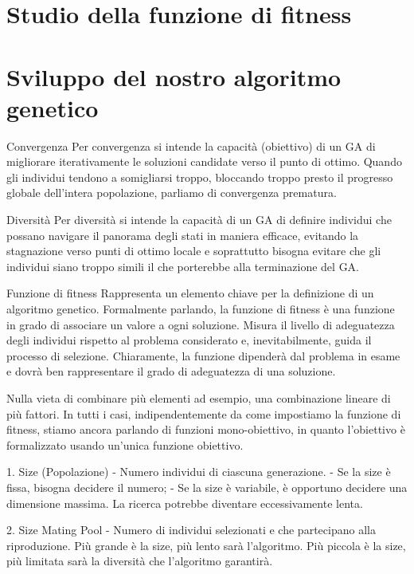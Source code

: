 \documentclass{article}
\begin{document}
\pagebreak

    \section{Studio della funzione di fitness}

    \section{Sviluppo del nostro algoritmo genetico}

    Convergenza Per convergenza si intende la capacità (obiettivo) di un GA di migliorare iterativamente le soluzioni candidate verso il punto di ottimo. Quando gli
    individui tendono a somigliarsi troppo, bloccando troppo presto il progresso globale dell’intera popolazione, parliamo di convergenza prematura.

    Diversità Per diversità si intende la capacità di un GA di definire individui che possano navigare il panorama degli stati in maniera efficace, evitando la
    stagnazione verso punti di ottimo locale e soprattutto bisogna evitare che gli individui siano troppo simili il che porterebbe alla terminazione del GA.

    Funzione di fitness Rappresenta un elemento chiave per la definizione di un algoritmo genetico. Formalmente parlando, la funzione di fitness è una funzione in grado
    di associare un valore a ogni soluzione. Misura il livello di adeguatezza degli individui rispetto al problema considerato e, inevitabilmente, guida il
    processo di selezione. Chiaramente, la funzione dipenderà dal problema in esame e dovrà ben rappresentare il grado di adeguatezza di una soluzione.

    Nulla vieta di combinare più elementi ad esempio, una combinazione lineare di più fattori. In tutti i casi, indipendentemente da come impostiamo la funzione di
    fitness, stiamo ancora parlando di funzioni mono-obiettivo, in quanto l’obiettivo è formalizzato usando un’unica funzione obiettivo.

    1. Size (Popolazione) - Numero individui di ciascuna generazione.
    - Se la size è fissa, bisogna decidere il numero;
    - Se la size è variabile, è opportuno decidere una dimensione massima. La ricerca potrebbe diventare eccessivamente lenta.

    2. Size Mating Pool - Numero di individui selezionati e che partecipano alla riproduzione.
    Più grande è la size, più lento sarà l’algoritmo. Più piccola è la size, più limitata sarà la diversità che l’algoritmo garantirà.
\end{document}
